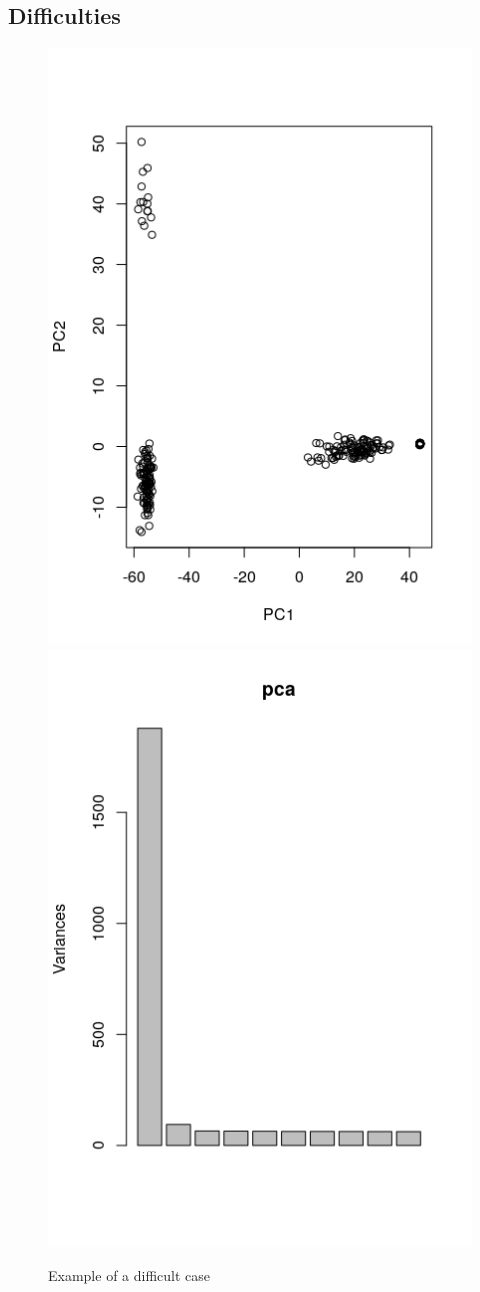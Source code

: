 \documentclass[a4paper, 11pt]{article}
\begin{document}
\subsection{Difficulties}


\begin{figure}[h!]
\caption{Example of a difficult case}
\includegraphics[scale=0.5]{Rplot_hard_example}
\includegraphics[scale=0.5]{hard_example_eigenvalues}

\end{figure}
\end{document}
